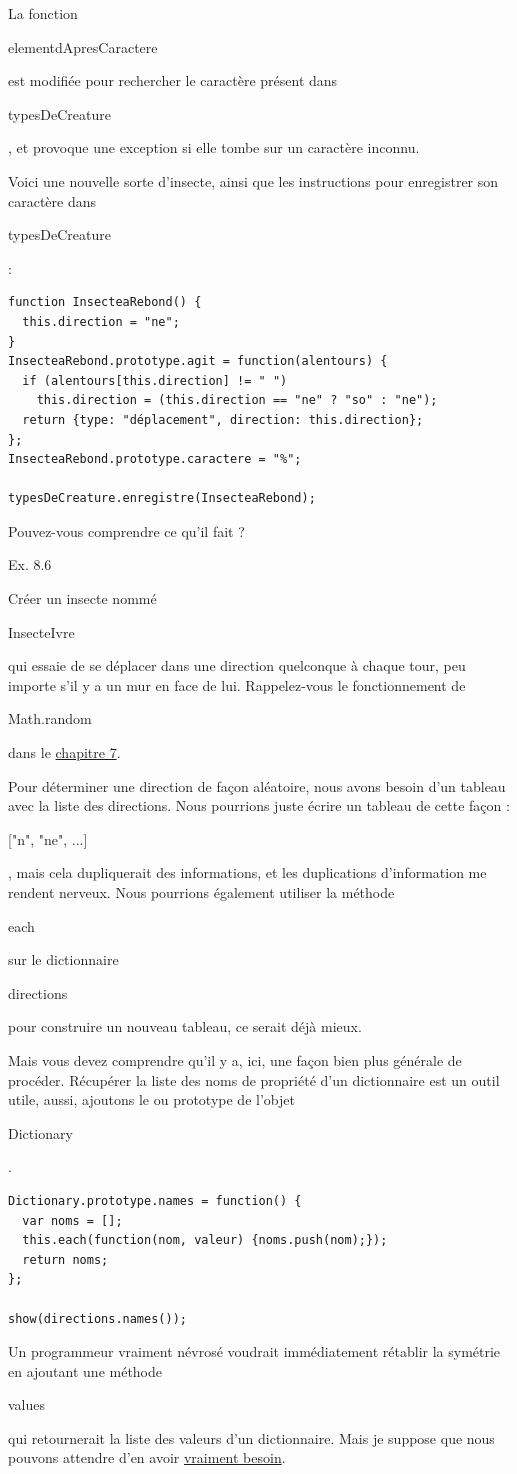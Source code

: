 \documentclass{FramateX}
\renewcommand{\texttt}[1]{\begin{sffamily}{#1}\end{sffamily}}
\begin{document}
La fonction \texttt{elementdApresCaractere} est modifiée pour rechercher
le caractère présent dans \texttt{typesDeCreature}, et provoque une
exception si elle tombe sur un caractère inconnu.

\begin{center}\end{center}

Voici une nouvelle sorte d'insecte, ainsi que les instructions pour
enregistrer son caractère dans \texttt{typesDeCreature}:

\begin{lstlisting}
function InsecteaRebond() {
  this.direction = "ne";
}
InsecteaRebond.prototype.agit = function(alentours) {
  if (alentours[this.direction] != " ")
    this.direction = (this.direction == "ne" ? "so" : "ne");
  return {type: "déplacement", direction: this.direction};
};
InsecteaRebond.prototype.caractere = "%";

typesDeCreature.enregistre(InsecteaRebond);
\end{lstlisting}
Pouvez-vous comprendre ce qu'il fait ?

\begin{center}\end{center}

Ex. 8.6

Créer un insecte nommé \texttt{InsecteIvre} qui essaie de se déplacer
dans une direction quelconque à chaque tour, peu importe s'il y a un mur
en face de lui. Rappelez-vous le fonctionnement de \texttt{Math.random}
dans le \href{chapter7.html}{chapitre 7}.

Pour déterminer une direction de façon aléatoire, nous avons besoin d'un
tableau avec la liste des directions. Nous pourrions juste écrire un
tableau de cette façon : \texttt{{[}"n", "ne", ...{]}}, mais cela
dupliquerait des informations, et les duplications d'information me
rendent nerveux. Nous pourrions également utiliser la méthode
\texttt{each} sur le dictionnaire \texttt{directions} pour construire un
nouveau tableau, ce serait déjà mieux.

Mais vous devez comprendre qu'il y a, ici, une façon bien plus générale
de procéder. Récupérer la liste des noms de propriété d'un dictionnaire
est un outil utile, aussi, ajoutons le ou prototype de l'objet
\texttt{Dictionary}.

\begin{lstlisting}
Dictionary.prototype.names = function() {
  var noms = [];
  this.each(function(nom, valeur) {noms.push(nom);});
  return noms;
};

show(directions.names());
\end{lstlisting}
Un programmeur vraiment névrosé voudrait immédiatement rétablir la
symétrie en ajoutant une méthode \texttt{values} qui retournerait la
liste des valeurs d'un dictionnaire. Mais je suppose que nous pouvons
attendre d'en avoir
\href{http://www.c2.com/cgi/wiki?YouArentGonnaNeedIt}{vraiment besoin}.
\end{document}
